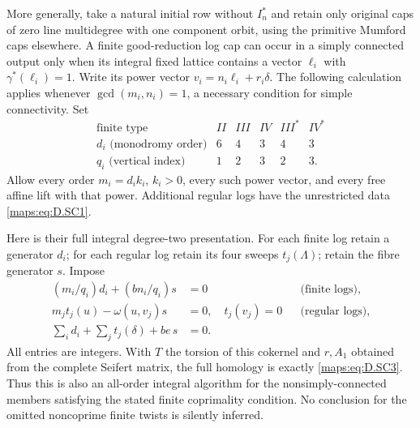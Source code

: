 \begin{theorem}
More generally, take a natural initial row without $I_n^*$ and
retain only original caps of zero line multidegree with one
component orbit, using the primitive Mumford caps elsewhere.
A finite good-reduction log cap can occur in a simply connected
output only when its integral fixed lattice contains a vector
$\ell_i$ with $\gamma^*(\ell_i)=1$. Write its power vector
$v_i=n_i\ell_i+r_i\delta$. The following calculation applies
whenever $\gcd(m_i,n_i)=1$, a necessary condition for simple
connectivity. Set
\[
\begin{array}{c|ccccc}
 \text{finite type}&II&III&IV&III^*&IV^*\\\hline
 d_i\text{ (monodromy order)}&6&4&3&4&3\\
 q_i\text{ (vertical index)}&1&2&3&2&3.
\end{array}                                                 \tag{D.HY2}\label{maps:eq:D.HY2}
\]
Allow every order $m_i=d_i k_i$, $k_i>0$, every such power vector,
and every free affine lift with that power. Additional regular logs
have the unrestricted data \eqref{maps:eq:D.SC1}.

Here is their full integral degree-two presentation. For each finite
log retain a generator $d_i$; for each regular log retain its four
sweeps $t_j(\Lambda)$; retain the fibre generator $s$. Impose
\[
\begin{aligned}
 (m_i/q_i)d_i+(bn_i/q_i)s&=0 &&\text{(finite logs)},\\
 m_jt_j(u)-\omega(u,v_j)s&=0,\quad t_j(v_j)=0
                                      &&\text{(regular logs)},\\
 \sum_i d_i+\sum_jt_j(\delta)+be\,s&=0. &
\end{aligned}                                                 \tag{D.HY3}\label{maps:eq:D.HY3}
\]
All entries are integers. With $T$ the torsion of this cokernel and
$r,A_1$ obtained from the complete Seifert matrix, the full homology
is exactly \eqref{maps:eq:D.SC3}. Thus this is also an all-order integral algorithm
for the nonsimply-connected members satisfying the stated finite
coprimality condition. No conclusion for the omitted noncoprime
finite twists is silently inferred.


\end{theorem}

